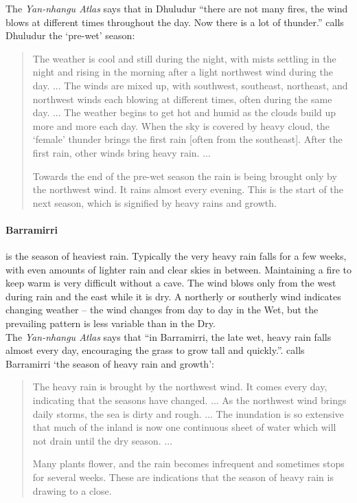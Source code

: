 The \textit{Yan-nhangu Atlas} says that in Dhuludur ``there are not many
fires, the wind blows at different times throughout the day. Now there is
a lot of thunder.''  \citet{davis1989} calls Dhuludur the `pre-wet' season:
\begin{quote}
    The weather is cool and still during the night, with mists settling in the night
    and rising in the morning after a light northwest wind during the day. ...
    The winds are mixed up, with southwest, southeast, northeast, and northwest winds
    each blowing at different times, often during the same day. ...
    The weather begins to get hot and humid as the clouds build up more and more each day.
    When the sky is covered by heavy cloud, the `female' thunder brings
    the first rain [often from the southeast].
    After the first rain, other winds bring heavy rain. ...

    Towards the end of the pre-wet season the rain is being brought only by the northwest wind.
    It rains almost every evening.
    This is the start of the next season, which is signified by heavy rains and growth.
\end{quote}


\paragraph{Barramirri} is the season of heaviest rain.  Typically the
very heavy rain falls for a few weeks, with even amounts of lighter rain
and clear skies in between.  Maintaining a fire to keep warm is very
difficult without a cave.  The wind blows only from the west during rain
and the east while it is dry.  A northerly or southerly wind indicates
changing weather -- the wind changes from day to day in the Wet, but the
prevailing pattern is less variable than in the Dry.\\

The \textit{Yan-nhangu Atlas} says that ``in Barramirri, the late wet,
heavy rain falls almost every day, encouraging the grass to grow tall
and quickly.''.
%
\citet{davis1989} calls Barramirri `the season of heavy rain and growth':
\begin{quote}
    The heavy rain is brought by the northwest wind. It comes every day,
    indicating that the seasons have changed. ... As the northwest wind
    brings daily storms, the sea is dirty and rough. ... The inundation
    is so extensive that much of the inland is now one continuous sheet
    of water which will not drain until the dry season. ...

    Many plants flower, and the rain becomes infrequent and sometimes
    stops for several weeks.  These are indications that the season of
    heavy rain is drawing to a close.
\end{quote}


